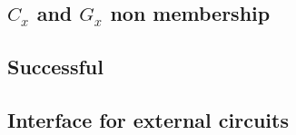 \subsection{$C_x$ and $G_x$ non membership}          \label{bls: circuits: CX GX non membership}           
\subsection{Successful }             \label{bls: circuits: successful pairing}             
\subsection{Interface for external circuits}         \label{bls: interface for exernal circuits}           
